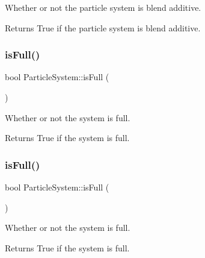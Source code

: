 Whether or not the particle system is blend additive.

\begin{DoxyReturn}{Returns}
True if the particle system is blend additive. 
\end{DoxyReturn}
\mbox{\label{classParticleSystem_a7f2ed7b7b7a0d5a078ac8df3c1503e47}} 
\subsubsection{\texorpdfstring{is\+Full()}{isFull()}\hspace{0.1cm}{\footnotesize\ttfamily [1/2]}}
{\footnotesize\ttfamily bool Particle\+System\+::is\+Full (\begin{DoxyParamCaption}{ }\end{DoxyParamCaption})}

Whether or not the system is full.

\begin{DoxyReturn}{Returns}
True if the system is full. 
\end{DoxyReturn}
\mbox{\label{classParticleSystem_a7f2ed7b7b7a0d5a078ac8df3c1503e47}} 
\subsubsection{\texorpdfstring{is\+Full()}{isFull()}\hspace{0.1cm}{\footnotesize\ttfamily [2/2]}}
{\footnotesize\ttfamily bool Particle\+System\+::is\+Full (\begin{DoxyParamCaption}{ }\end{DoxyParamCaption})}

Whether or not the system is full.

\begin{DoxyReturn}{Returns}
True if the system is full. 
\end{DoxyReturn}
\mbox{\label{classParticleSystem_a36df0682b59803de36c914ce2bffe47d}} 
